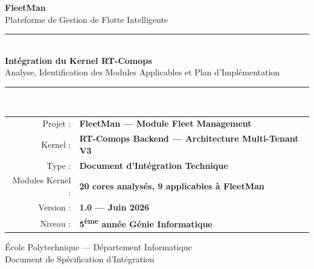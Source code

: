 \documentclass[12pt,a4paper]{report}
\begin{document}
\begin{titlepage}
  \pagecolor{fleetdark}
  \color{white}
  \centering
  \vspace*{1.5cm}

  {\fontsize{50}{60}\selectfont\bfseries\textcolor{fleetblue}{FleetMan}}\\[0.3cm]
  {\Large\textcolor{white!70}{Plateforme de Gestion de Flotte Intelligente}}\\[2cm]

  \textcolor{fleetblue}{\rule{0.85\textwidth}{2pt}}\\[0.8cm]

  {\LARGE\bfseries Intégration du Kernel RT-Comops}\\[0.4cm]
  {\large Analyse, Identification des Modules Applicables et Plan d'Implémentation}\\[0.8cm]

  \textcolor{fleetblue}{\rule{0.85\textwidth}{1pt}}\\[1.5cm]

  \begin{tabular}{rl}
    \textcolor{white!60}{Projet :}       & \textbf{FleetMan — Module Fleet Management} \\[0.3cm]
    \textcolor{white!60}{Kernel :}       & \textbf{RT-Comops Backend — Architecture Multi-Tenant V3} \\[0.3cm]
    \textcolor{white!60}{Type :}         & \textbf{Document d'Intégration Technique} \\[0.3cm]
    \textcolor{white!60}{Modules Kernel :} & \textbf{20 cores analysés, 9 applicables à FleetMan} \\[0.3cm]
    \textcolor{white!60}{Version :}      & \textbf{1.0 — Juin 2026} \\[0.3cm]
    \textcolor{white!60}{Niveau :}       & \textbf{5\textsuperscript{ème} année Génie Informatique} \\
  \end{tabular}

  \vfill

  {\small\textcolor{white!50}{École Polytechnique — Département Informatique}}\\
  {\small\textcolor{white!50}{Document de Spécification d'Intégration}}
\end{titlepage}
\nopagecolor

\tableofcontents
\newpage
\end{document}
